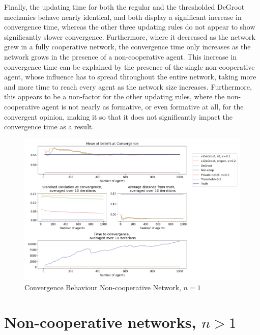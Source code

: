 \documentclass[a4paper, 12pt]{report}
\begin{document}
\noindent Finally, the updating time for both the regular and the thresholded DeGroot mechanics behave nearly identical, and both display a significant increase in convergence time, whereas the other three updating rules do not appear to show significantly slower convergence. Furthermore, where it decreased as the network grew in a fully cooperative network, the convergence time only increases as the network grows in the presence of a non-cooperative agent. This increase in convergence time can be explained by the presence of the single non-cooperative agent, whose influence has to spread throughout the entire network, taking more and more time to reach every agent as the network size increases. Furthermore, this appears to be a non-factor for the other updating rules, where the non-cooperative agent is not nearly as formative, or even formative at all, for the convergent opinion, making it so that it does not significantly impact the convergence time as a result.

\begin{center}
    \begin{figure}[!htbp]
        \centering
        \includegraphics[width=1.2\textwidth]{ThesisKI/Images/WisdomCompare1.png}
        \caption{Convergence Behaviour Non-cooperative Network, $n=1$}
        \label{noncoop1:compare}
    \end{figure}
\end{center}

\newpage

\section{Non-cooperative networks, $n > 1$}
\end{document}
